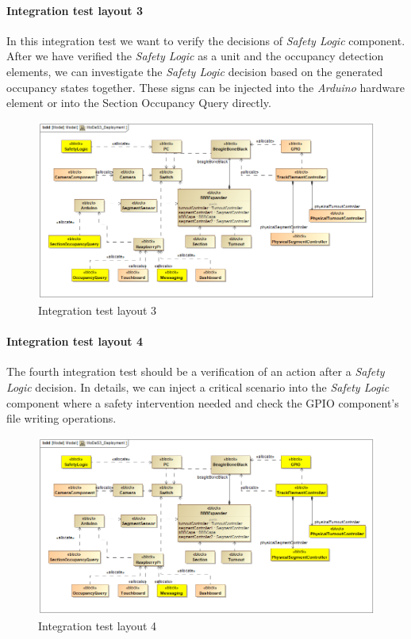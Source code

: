 \paragraph{Integration test layout 3}
In this integration test we want to verify the decisions of \textit{Safety Logic} component. After we have verified the \textit{Safety Logic} as a unit and the occupancy detection elements, we can investigate the \textit{Safety Logic} decision based on the generated occupancy states together. These signs can be injected into the \textit{Arduino} hardware element or into the Section Occupancy Query directly.
\begin{figure}[!h]
	\centering
	\includegraphics[width=150mm, keepaspectratio]{figures/testDesign/testLayoutSYSML/MoDeS3_Deployment-test3.png}
	\caption{Integration test layout 3}
	\label{fig:MoDeS3_Deployment-test3}
\end{figure}

\paragraph{Integration test layout 4}
The fourth integration test should be a verification of an action after a \textit{Safety Logic} decision. In details, we can inject a critical scenario into the \textit{Safety Logic} component where a safety intervention needed and check the GPIO component's file writing operations.
\begin{figure}[!h]
	\centering
	\includegraphics[width=150mm, keepaspectratio]{figures/testDesign/testLayoutSYSML/MoDeS3_Deployment-test4.png}
	\caption{Integration test layout 4}
	\label{fig:MoDeS3_Deployment-test4}
\end{figure}

